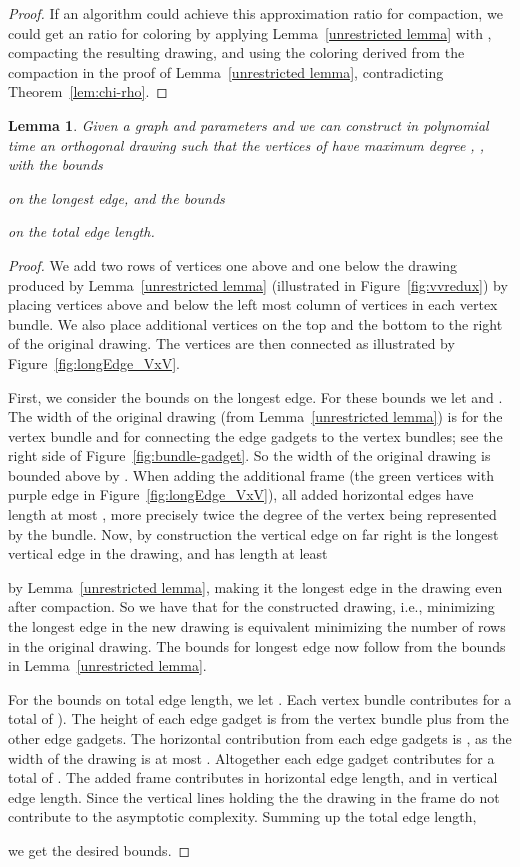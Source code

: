 \documentclass[12pt]{article}
\newtheorem{lemma}[theorem]{Lemma}
\theoremstyle{definitions}
\begin{document}
\begin{proof}
If an algorithm could achieve this approximation ratio for compaction, we could get an  ratio for coloring by applying Lemma~\ref{unrestricted lemma} with \mbox{}, compacting the resulting drawing, and using the coloring derived from the compaction in the proof of Lemma~\ref{unrestricted lemma}, contradicting Theorem~\ref{lem:chi-rho}.
\end{proof}
\newpage
\begin{lemma}
\label{lem:vxvlong}
Given a graph  and parameters  and  we can construct in polynomial time an orthogonal drawing  such that the vertices of  have maximum degree , , with the bounds

on the longest edge, and the bounds

on the total edge length.
\end{lemma}
\begin{proof}
We add two rows of vertices one above and one below the drawing produced by
Lemma~\ref{unrestricted lemma} (illustrated in Figure~\ref{fig:vvredux}) by
placing vertices above and below the left most column of vertices in each vertex bundle.
We also place  additional vertices on the top and the bottom to the right of the original drawing. The vertices are then connected as illustrated by Figure~\ref{fig:longEdge_VxV}.

First, we consider the bounds on the longest edge. For these bounds we let  and . The width of the original drawing (from Lemma~\ref{unrestricted lemma}) is  for the vertex bundle and  for connecting the edge gadgets to the vertex bundles; see the right side of Figure~\ref{fig:bundle-gadget}. So the width of the original drawing is bounded above by . When adding the additional frame (the green vertices with purple edge in Figure~\ref{fig:longEdge_VxV}), all added horizontal edges have length at most , more precisely twice the degree of the vertex being represented by the bundle. Now, by construction the vertical edge on far right is the longest vertical edge in the drawing, and has length at least

by Lemma~\ref{unrestricted lemma}, making it the longest edge in the drawing even after compaction. So we have that  for the constructed drawing, i.e., minimizing the longest edge in the new drawing is equivalent minimizing the number of rows in the original drawing. The bounds for longest edge now follow from the bounds in Lemma~\ref{unrestricted lemma}.

For the bounds on total edge length, we let . Each vertex bundle contributes  for a total of ). The height of each edge gadget is  from the vertex bundle plus  from the other edge gadgets. The horizontal contribution from each edge gadgets is , as the width of the drawing is at most . Altogether each edge gadget contributes  for a total of . The added frame contributes  in horizontal edge length, and  in vertical edge length. Since  the vertical lines holding the the drawing in the frame do not contribute to the asymptotic complexity. Summing up the total edge length,

we get the desired bounds.
\end{proof}
\end{document}
